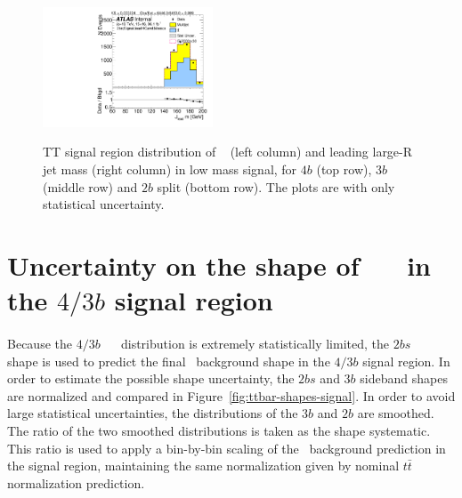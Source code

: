 \begin{figure}[htbp!]
\begin{center}
\includegraphics[width=0.45\textwidth,angle=-90]{figures/boosted/TT/Moriond_TT_TwoTag_split_Signal_leadHCand_Mass_s.pdf}\\
\end{center}
\caption{TT signal region distribution of \mtwoJ~ (left column) and leading large-R jet mass (right column) in low mass signal, for $4b$ (top row), $3b$(middle row) and $2b$ split (bottom row). The plots are with only statistical uncertainty.}
\label{CRSB:TTSR_Distribution}
\end{figure}


\clearpage
\section{Uncertainty on the shape of \ttbar\ \mtwoJ~ in the $4/3b$ signal region}
\label{sec:unc-shape-ttbar-in-sr}

\paragraph{}
Because the $4/3b$ \ttbar\ \mtwoJ~ distribution is extremely statistically limited, the $2bs$ \ttbar\ \mtwoJ~ shape is used to predict the final \ttbar\ background shape in the $4/3b$ signal region.
In order to estimate the possible shape uncertainty, the $2bs$ and $3b$ sideband shapes are normalized and compared in Figure~\ref{fig:ttbar-shapes-signal}.  
In order to avoid large statistical uncertainties, the distributions of the $3b$ and $2b$ are smoothed. 
The ratio of the two smoothed distributions is taken as the shape systematic. 
This ratio is used to apply a bin-by-bin scaling of the \ttbar\ background prediction in the signal region, maintaining the same normalization given by nominal $t\bar{t}$ normalization prediction.


